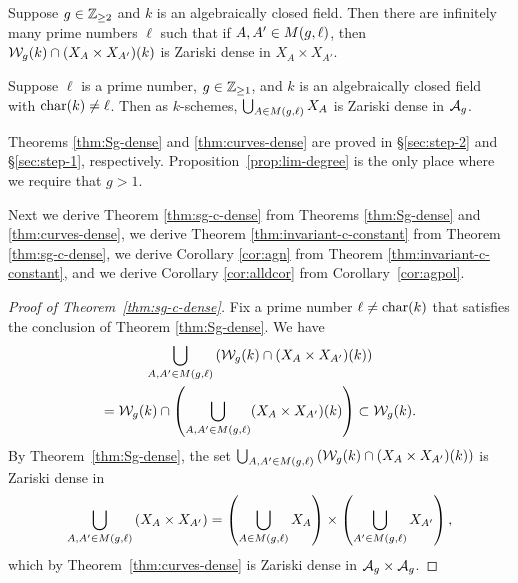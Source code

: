 \documentclass{amsart}
\begin{document}
\begin{theorem}\label{thm:Sg-dense}
  Suppose $g\in\mathbb{Z}_{\ge 2}$ and $k$ is an algebraically closed field.
  Then there are infinitely many prime numbers $\ell$ such that if
  $A,A' \in M(g,\ell)$, then $\mathcal{W}_g(k) \cap (X_A \times X_{A'})(k)$ is Zariski dense in $X_A \times X_{A'}$.
\end{theorem}

\begin{theorem}\label{thm:curves-dense}
    Suppose $\ell$ is a prime number, $g\in\mathbb{Z}_{\ge 1}$, and $k$ is an algebraically closed field with $\operatorname{char}(k) \neq \ell$. Then as $k$-schemes, $\bigcup_{A \in M(g,\ell)} X_A$ is Zariski dense in $\mathcal{A}_g$.
\end{theorem}

Theorems \ref{thm:Sg-dense} and \ref{thm:curves-dense} are proved in \S\ref{sec:step-2} and \S\ref{sec:step-1}, respectively. Proposition~\ref{prop:lim-degree} is the only place where we require that $g > 1$.

Next we derive Theorem \ref{thm:sg-c-dense} from Theorems \ref{thm:Sg-dense} and \ref{thm:curves-dense},  we derive Theorem \ref{thm:invariant-c-constant} from Theorem \ref{thm:sg-c-dense},  we derive Corollary \ref{cor:agn} from Theorem \ref{thm:invariant-c-constant}, and we derive Corollary \ref{cor:alldcor} from Corollary~\ref{cor:agpol}.

\begin{proof}[Proof of Theorem~\ref{thm:sg-c-dense}]
Fix a prime number $\ell\neq\operatorname{char}(k)$ that satisfies the conclusion of Theorem \ref{thm:Sg-dense}. We have
\begin{multline*}
\bigcup_{A,A' \in M(g,\ell)} \left(\mathcal{W}_g(k) \cap (X_A \times X_{A'})(k)\right) \\
 =  \mathcal{W}_g(k) \cap \left(\bigcup_{A,A' \in M(g,\ell)} (X_A \times X_{A'})(k)\right)
   \subset \mathcal{W}_g(k).
\end{multline*}
By Theorem~\ref{thm:Sg-dense}, the set
$\bigcup_{A,A' \in M(g,\ell)} \left(\mathcal{W}_g(k) \cap (X_A \times X_{A'})(k)\right)$ is Zariski dense in
$$
\bigcup_{A,A' \in M(g,\ell)} \left(X_A \times X_{A'}\right) =
    \left(\bigcup_{A \in M(g,\ell)} X_A\right) \times \left(\bigcup_{A' \in M(g,\ell)} X_{A'}\right),
    $$
    which by Theorem~\ref{thm:curves-dense} is Zariski dense in $\mathcal{A}_g \times \mathcal{A}_g$.
\end{proof}
\end{document}
